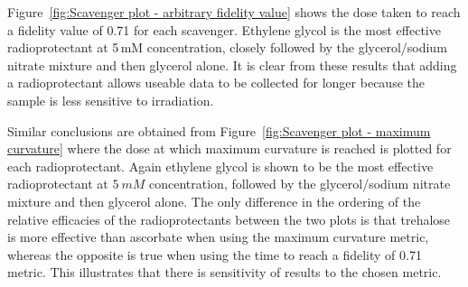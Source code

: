 Figure~\ref{fig:Scavenger plot - arbitrary fidelity value} shows the dose taken to reach a fidelity value of 0.71 for each scavenger. Ethylene glycol is the most effective radioprotectant at 5$\,$mM concentration, closely followed by the glycerol/sodium nitrate mixture and then glycerol alone. It is clear from these results that adding a radioprotectant allows useable data to be collected for longer because the sample is less sensitive to irradiation.

Similar conclusions are obtained from Figure~\ref{fig:Scavenger plot - maximum curvature} where the dose at which maximum curvature is reached is plotted for each radioprotectant. Again ethylene glycol is shown to be the most effective radioprotectant at $5\ mM$ concentration, followed by the glycerol/sodium nitrate mixture and then glycerol alone. The only difference in the ordering of the relative efficacies of the radioprotectants between the two plots is that trehalose is more effective than ascorbate when using the maximum curvature metric, whereas the opposite is true when using the time to reach a fidelity of 0.71 metric.
This illustrates that there is sensitivity of results to the chosen metric.

